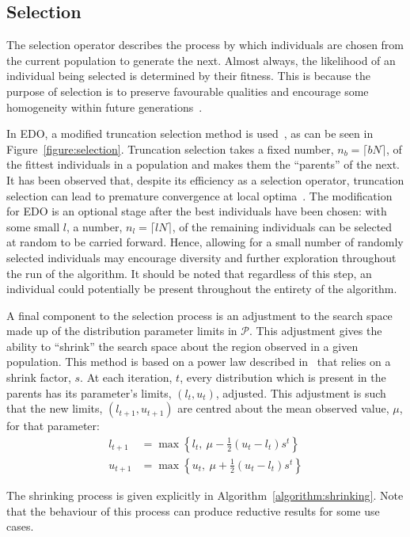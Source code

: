 \subsection{Selection}

The selection operator describes the process by which individuals are chosen
from the current population to generate the next. Almost always, the likelihood
of an individual being selected is determined by their fitness. This is because
the purpose of selection is to preserve favourable qualities and encourage some
homogeneity within future generations~\cite{Back1994}.



In EDO, a modified truncation selection method is used~\cite{Jebari2013}, as can
be seen in Figure~\ref{figure:selection}. Truncation selection takes a fixed
number, \(n_b = \lceil bN\rceil\), of the fittest individuals in a population
and makes them the ``parents'' of the next. It has been observed that, despite
its efficiency as a selection operator, truncation selection can lead to
premature convergence at local optima~\cite{Jebari2013, Tatsuya2002}. The
modification for EDO is an optional stage after the best individuals have been
chosen: with some small \(l\), a number, \(n_l = \lceil lN\rceil\), of the
remaining individuals can be selected at random to be carried forward. Hence,
allowing for a small number of randomly selected individuals may encourage
diversity and further exploration throughout the run of the algorithm. It should
be noted that regardless of this step, an individual could potentially be
present throughout the entirety of the algorithm.

A final component to the selection process is an adjustment to the search space
made up of the distribution parameter limits in \(\mathcal{P}\). This adjustment
gives the ability to ``shrink'' the search space about the region observed in a
given population. This method is based on a power law described
in~\cite{Amirjanov2016} that relies on a shrink factor, \(s\). At each
iteration, \(t\), every distribution which is present in the parents has its
parameter's limits, \(\left(l_t, u_t\right)\), adjusted. This adjustment is such
that the new limits, \(\left(l_{t+1}, u_{t+1}\right)\) are centred about the
mean observed value, \(\mu\), for that parameter:
\begin{align}
    \label{eq:shrinking_lower}
    l_{t+1}&= \max \left\{l_t, \ \mu - \frac{1}{2} (u_t - l_t) s^t\right\}\\
    \label{eq:shrinking_upper}
    u_{t+1}&= \max \left\{u_t, \ \mu + \frac{1}{2} (u_t - l_t) s^t\right\}
\end{align}

The shrinking process is given explicitly in
Algorithm~\ref{algorithm:shrinking}. Note that the behaviour of this process can 
produce reductive results for some use cases.


